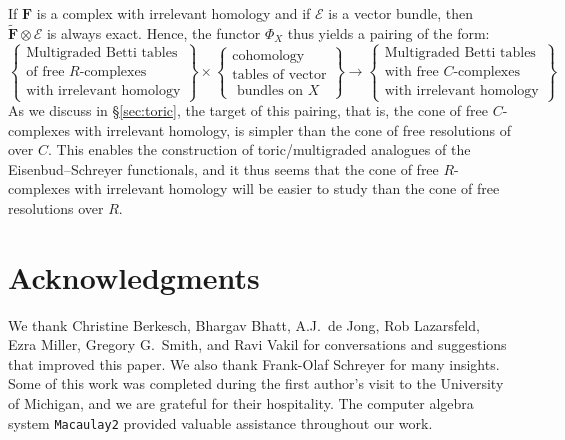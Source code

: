\documentclass[12pt]{amsart}
\theoremstyle{definition}
\theoremstyle{remark}
\newcommand{\cE}{\mathcal{E}}
\newcommand{\FF}{\mathbf{F}}
\begin{document}
If $\FF$ is a complex with irrelevant homology and if $\cE$ is a vector bundle, then $\widetilde{\FF}\otimes \cE$ is always exact.  Hence, the functor $\Phi_{X}$ thus yields a pairing of the form:
\begin{equation*}%
\label{eqn:multipairing}
%
\left\{\begin{matrix}
\text{Multigraded Betti tables} \\ \text{of free $R$-complexes}\\
\text{with irrelevant homology}\end{matrix}\right\}
%
\times 
%
\left\{\begin{matrix}
\text{cohomology }\\
\text{tables of vector}\\
\text{ bundles on } X
\end{matrix}\right\}
%
\longrightarrow
\left\{\begin{matrix}
\text{Multigraded Betti tables} \\ \text{with  free $C$-complexes}\\
\text{with irrelevant homology}
\end{matrix}\right\}
\end{equation*}
As we discuss in \S\ref{sec:toric}, the target of this pairing, that is, the cone of free $C$-complexes with irrelevant homology, is simpler than the cone of free resolutions of over $C$.  This enables the construction of toric/multigraded analogues of the Eisenbud--Schreyer functionals, and it thus seems that the cone of free $R$-complexes with irrelevant homology will be easier to study than the cone of free resolutions over $R$. 

\section*{Acknowledgments}
We thank Christine Berkesch, Bhargav Bhatt, A.J.\ de Jong, Rob Lazarsfeld, Ezra Miller, Gregory G.\ Smith, and Ravi Vakil for conversations and suggestions that improved this paper.  We also thank Frank-Olaf Schreyer for many insights.
Some of this work was completed during the first author's visit to the University of Michigan, and we are grateful for their hospitality.  The computer
algebra system \texttt{Macaulay2} \cite{M2} provided valuable assistance throughout our work.
\end{document}
